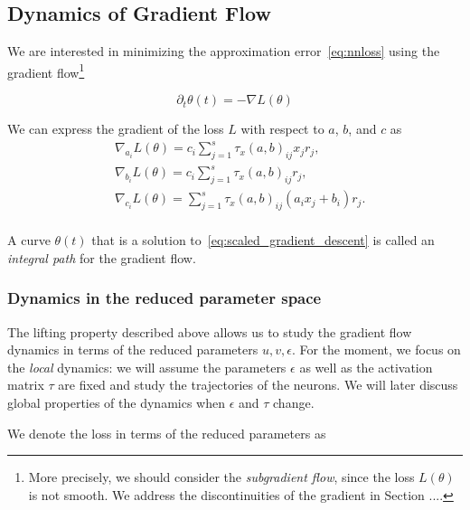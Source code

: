 \subsection{Dynamics of Gradient Flow} 
We are interested in minimizing the approximation error~\eqref{eq:nnloss} using the gradient flow\footnote{More precisely, we should consider the \emph{subgradient flow}, since the loss $L(\theta)$ is not smooth. We address the discontinuities of the gradient in Section ....}

\begin{equation}\label{eq:scaled_gradient_descent}
\partial_t \theta(t) = -\nabla L(\theta)
\end{equation}

We can express the gradient of the loss $L$ with respect to $a$, $b$, and $c$ as
\begin{equation}\label{eq:derivative_equations}
\begin{aligned}
&\nabla_{a_i}L(\theta) = c_i \sum_{j=1}^s \tau_x(a, b)_{ij} x_j r_j,\\
&\nabla_{b_i}L(\theta) = c_i \sum_{j=1}^s \tau_x(a, b)_{ij} r_j,\\
&\nabla_{c_i}L(\theta) = \sum_{j=1}^s \tau_x(a, b)_{ij} (a_i x_j + b_i) r_j.\\
\end{aligned}
\end{equation}

A curve $\theta(t)$ that is a solution to~\eqref{eq:scaled_gradient_descent} is called an \emph{integral path} for the gradient flow.


\subsubsection{Dynamics in the reduced parameter space}

The lifting property described above allows us to study the gradient flow dynamics in terms of the reduced parameters $u, v, \epsilon$. For the moment, we focus on the \emph{local} dynamics: we will assume the parameters $\epsilon$ as well as the activation matrix $\tau$ are fixed and study the trajectories of the neurons. We will later discuss global properties of the dynamics when $\epsilon$ and $\tau$ change.

We denote the loss in terms of the reduced parameters as

